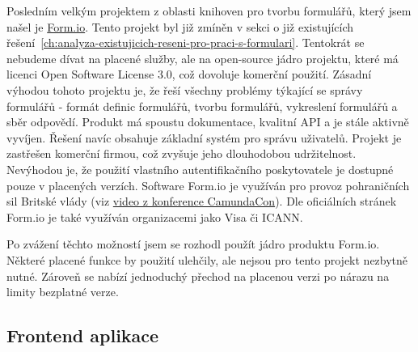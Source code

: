 Posledním velkým projektem z oblasti knihoven pro tvorbu formulářů, který jsem našel je \href{https://form.io/}{Form.io}.
Tento projekt byl již zmíněn v sekci o již existujících řešení\ \ref{ch:analyza-existujicich-reseni-pro-praci-s-formulari}.
Tentokrát se nebudeme dívat na placené služby, ale na open-source jádro projektu, které má licenci Open Software License 3.0, což dovoluje komerční použití.
Zásadní výhodou tohoto projektu je, že řeší všechny problémy týkající se správy formulářů - formát definic formulářů, tvorbu formulářů, vykreslení formulářů a sběr odpovědí.
Produkt má spoustu dokumentace, kvalitní API a je stále aktivně vyvíjen.
Řešení navíc obsahuje základní systém pro správu uživatelů.
Projekt je zastřešen komerční firmou, což zvyšuje jeho dlouhodobou udržitelnost.
Nevýhodou je, že použití vlastního autentifikačního poskytovatele je dostupné pouze v placených verzích.
Software Form.io je využíván pro provoz pohraničních sil Britské vlády (viz \href{https://www.youtube.com/watch?v=nuf46N5vU34}{video z konference CamundaCon}).
Dle oficiálních stránek Form.io je také využíván organizacemi jako Visa či ICANN\@.

Po zvážení těchto možností jsem se rozhodl použít jádro produktu Form.io.
Některé placené funkce by použití ulehčily, ale nejsou pro tento projekt nezbytně nutné.
Zároveň se nabízí jednoduchý přechod na placenou verzi po nárazu na limity bezplatné verze.

\subsection{Frontend aplikace}\label{subsec:frontend-aplikace}

